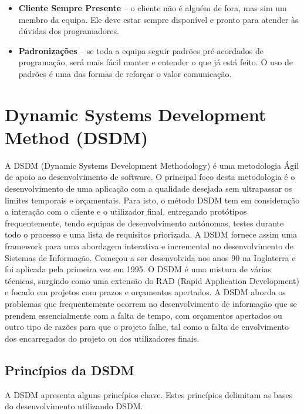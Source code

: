 \begin{itemize}
    \item \textbf{Cliente Sempre Presente} – o cliente não é alguém de fora, mas sim um membro da equipa. Ele deve estar sempre disponível e pronto para atender às dúvidas dos programadores.
    
    \item \textbf{Padronizações} – se toda a equipa seguir padrões pré-acordados de programação, será mais fácil manter e entender o que já está feito. O uso de padrões é uma das formas de reforçar o valor comunicação.
\end{itemize}


\newpage

\section{Dynamic Systems Development Method (DSDM)}

A DSDM (Dynamic Systems Development Methodology) é uma metodologia Ágil de apoio ao desenvolvimento de software. O principal foco desta metodologia é o desenvolvimento de uma aplicação com a qualidade desejada sem ultrapassar os limites temporais e orçamentais. Para isto, o método DSDM tem em consideração a interação com o cliente e o utilizador final, entregando protótipos frequentemente, tendo equipas de desenvolvimento autónomas, testes durante todo o processo e uma lista de requisitos priorizada. A DSDM fornece assim uma framework para uma abordagem interativa e incremental no desenvolvimento de Sistemas de Informação. Começou a ser desenvolvida nos anos 90 na Inglaterra e foi aplicada pela primeira vez em 1995. O DSDM é uma mistura de várias técnicas, surgindo como uma extensão do RAD (Rapid Application Development) e focado em projetos com prazos e orçamentos apertados.
A DSDM aborda os problemas que frequentemente ocorrem no desenvolvimento de informação que se prendem essencialmente com a falta de tempo, com orçamentos apertados ou outro tipo de razões para que o projeto falhe, tal como a falta de envolvimento dos encarregados do projeto ou dos utilizadores finais. 

\subsection{Princípios da DSDM}

A DSDM apresenta alguns princípios chave. Estes princípios delimitam as bases do desenvolvimento utilizando DSDM. 

